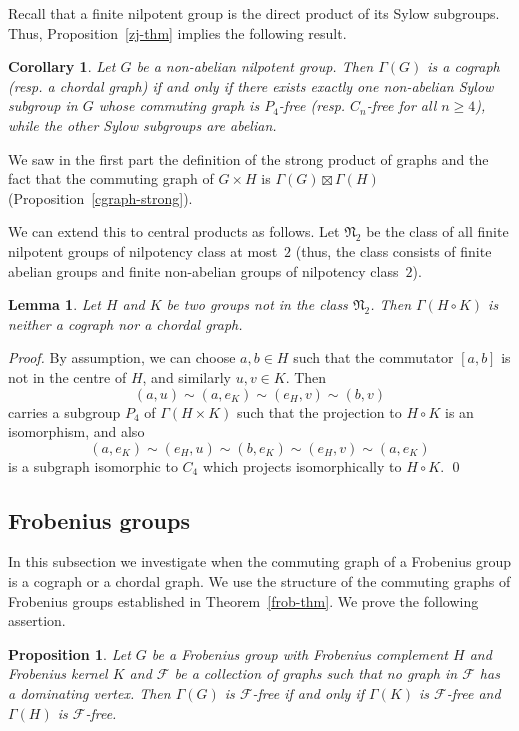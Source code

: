 \documentclass{elsarticle}
\newtheorem{cor}[theorem]{Corollary}
\newtheorem{prop}[theorem]{Proposition}
\newtheorem{lemma}[theorem]{Lemma}
\begin{document}
Recall that a finite nilpotent group is the direct product of its Sylow subgroups.  Thus, Proposition~\ref{zj-thm} implies the following result.

\begin{cor}\label{Nilp-cog}
Let $G$ be a non-abelian nilpotent group. Then $\Gamma(G)$ is a
cograph {\rm(}resp. a chordal graph{\rm)} if and only if there exists exactly one non-abelian Sylow subgroup in $G$ whose commuting graph is $P_4$-free {\rm(}resp. $C_n$-free for all $n\ge 4${\rm)}, while the other Sylow subgroups are abelian.
\end{cor}

We saw in the first part the definition of the strong product of graphs and
the fact that the commuting graph of $G\times H$ is
$\Gamma(G)\boxtimes\Gamma(H)$ (Proposition~\ref{cgraph-strong}).

We can extend this to central products as follows. Let $\mathfrak{N}_2$ be the class of all finite nilpotent groups of nilpotency class at most~$2$ (thus, the class consists of finite abelian groups and finite non-abelian groups of nilpotency class~$2$).

\begin{lemma}\label{lem_cp}
Let $H$ and $K$ be two groups not in the class $\mathfrak{N}_2$.
Then $\Gamma(H\circ K)$ is neither a cograph nor a chordal graph.
\end{lemma}

\begin{proof}
By assumption, we can choose $a,b\in H$ such that the commutator
$[a,b]$ is not in the centre of $H$, and similarly $u,v\in K$.
Then
\[(a,u)\sim(a,e_K)\sim(e_H,v)\sim(b,v)\]
carries a subgroup $P_4$ of $\Gamma(H\times K)$ such that the projection to
$H\circ K$ is an isomorphism, and also
\[(a,e_K)\sim(e_H,u)\sim(b,e_K)\sim(e_H,v)\sim(a,e_K)\]
is a subgraph isomorphic to $C_4$ which projects isomorphically to $H\circ K$.
\qed
\end{proof}

\subsection{Frobenius groups}

In this subsection we investigate when the commuting graph of a Frobenius group is a cograph or a chordal graph. We use the structure of the commuting graphs of
Frobenius groups established in Theorem~\ref{frob-thm}. We prove the following
assertion.


\begin{prop}\label{Frobenius} Let $G$ be a Frobenius group with Frobenius complement $H$ and Frobenius kernel $K$ and $\mathcal{F}$ be a collection of graphs such that no graph in $\mathcal{F}$ has a dominating vertex. Then $\Gamma(G)$ is $\mathcal{F}$-free if and only if $\Gamma(K)$ is $\mathcal{F}$-free and $\Gamma(H)$ is $\mathcal{F}$-free.
\end{prop}
\end{document}
